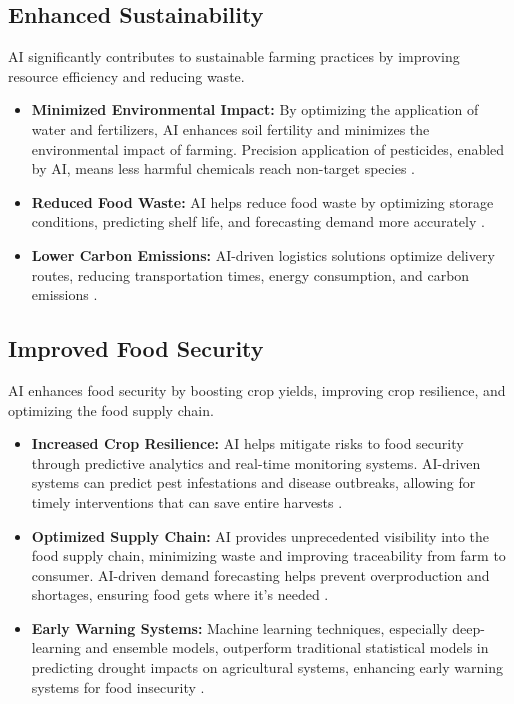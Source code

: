 \subsection{Enhanced Sustainability}
AI significantly contributes to sustainable farming practices by improving resource efficiency and reducing waste.
\begin{itemize}
    \item \textbf{Minimized Environmental Impact:} By optimizing the application of water and fertilizers, AI enhances soil fertility and minimizes the environmental impact of farming. Precision application of pesticides, enabled by AI, means less harmful chemicals reach non-target species \cite{RenewableEnergyMagazine_Benefits, VlinkInfo_Benefits}.
    \item \textbf{Reduced Food Waste:} AI helps reduce food waste by optimizing storage conditions, predicting shelf life, and forecasting demand more accurately \cite{SustainabilityLinkedIn_Benefits, Womentech_Benefits}.
    \item \textbf{Lower Carbon Emissions:} AI-driven logistics solutions optimize delivery routes, reducing transportation times, energy consumption, and carbon emissions \cite{SustainabilityLinkedIn_Benefits}.
\end{itemize}

\subsection{Improved Food Security}
AI enhances food security by boosting crop yields, improving crop resilience, and optimizing the food supply chain.
\begin{itemize}
    \item \textbf{Increased Crop Resilience:} AI helps mitigate risks to food security through predictive analytics and real-time monitoring systems. AI-driven systems can predict pest infestations and disease outbreaks, allowing for timely interventions that can save entire harvests \cite{SustainabilityLinkedIn_Benefits}.
    \item \textbf{Optimized Supply Chain:} AI provides unprecedented visibility into the food supply chain, minimizing waste and improving traceability from farm to consumer. AI-driven demand forecasting helps prevent overproduction and shortages, ensuring food gets where it's needed \cite{ThroughputWorld_Benefits}.
    \item \textbf{Early Warning Systems:} Machine learning techniques, especially deep-learning and ensemble models, outperform traditional statistical models in predicting drought impacts on agricultural systems, enhancing early warning systems for food insecurity \cite{ResearchGate_FoodSecurity}.
\end{itemize}

